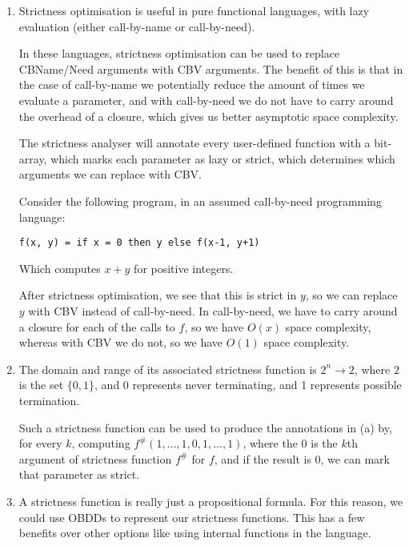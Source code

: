 


\begin{enumerate}[label=(\alph*)]
  \item

    Strictness optimisation is useful in pure functional languages, with lazy evaluation (either call-by-name or call-by-need).

    In these languages, strictness optimisation can be used to replace CBName/Need arguments with CBV arguments. The benefit of this is that in the case of call-by-name we potentially reduce the amount of times we evaluate a parameter, and with call-by-need we do not have to carry around the overhead of a closure, which gives us better asymptotic space complexity.

    The strictness analyser will annotate every user-defined function with a bit-array, which marks each parameter as lazy or strict, which determines which arguments we can replace with CBV.

    Consider the following program, in an assumed call-by-need programming language:

\begin{verbatim}
f(x, y) = if x = 0 then y else f(x-1, y+1)
\end{verbatim}
Which computes $x+y$ for positive integers.

After strictness optimisation, we see that this is strict in $y$, so we can replace $y$ with CBV instead of call-by-need. In call-by-need, we have to carry around a closure for each of the calls to $f$, so we have $O(x)$ space complexity, whereas with CBV we do not, so we have $O(1)$ space complexity.

\item

  The domain and range of its associated strictness function is $2^n \rightarrow 2$, where $2$ is the set $\{0,1\}$, and 0 represents never terminating, and 1 represents possible termination.

  Such a strictness function can be used to produce the annotations in (a) by, for every $k$, computing $f^{\#}(1,...,1,0,1,...,1)$, where the 0 is the $k$th argument of strictness function $f^{\#}$ for $f$, and if the result is 0, we can mark that parameter as strict.

\item
  A strictness function is really just a propositional formula. For this reason, we could use OBDDs to represent our strictness functions. This has a few benefits over other options like using internal functions in the language.


\end{enumerate}
